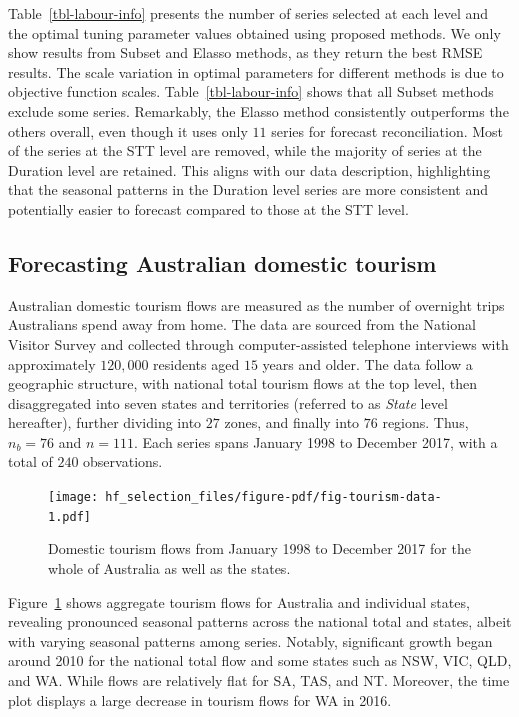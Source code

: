 \documentclass[
  11pt]{article}
\begin{document}
Table~\ref{tbl-labour-info} presents the number of series selected at
each level and the optimal tuning parameter values obtained using
proposed methods. We only show results from Subset and Elasso methods,
as they return the best RMSE results. The scale variation in optimal
parameters for different methods is due to objective function scales.
Table~\ref{tbl-labour-info} shows that all Subset methods exclude some
series. Remarkably, the Elasso method consistently outperforms the
others overall, even though it uses only \(11\) series for forecast
reconciliation. Most of the series at the STT level are removed, while
the majority of series at the Duration level are retained. This aligns
with our data description, highlighting that the seasonal patterns in
the Duration level series are more consistent and potentially easier to
forecast compared to those at the STT level.

\hypertarget{sec-tourism}{%
\subsection{Forecasting Australian domestic tourism}\label{sec-tourism}}

Australian domestic tourism flows are measured as the number of
overnight trips Australians spend away from home. The data are sourced
from the National Visitor Survey and collected through computer-assisted
telephone interviews with approximately \(120,000\) residents aged
\(15\) years and older. The data follow a geographic structure, with
national total tourism flows at the top level, then disaggregated into
seven states and territories (referred to as \emph{State} level
hereafter), further dividing into \(27\) zones, and finally into \(76\)
regions. Thus, \(n_b=76\) and \(n=111\). Each series spans January 1998
to December 2017, with a total of \(240\) observations.

\begin{figure}

{\centering \texttt{[image: hf\_selection\_files/figure-pdf/fig-tourism-data-1.pdf]}

}

\caption{\label{fig-tourism-data}Domestic tourism flows from January
1998 to December 2017 for the whole of Australia as well as the states.}

\end{figure}

Figure~\ref{fig-tourism-data} shows aggregate tourism flows for
Australia and individual states, revealing pronounced seasonal patterns
across the national total and states, albeit with varying seasonal
patterns among series. Notably, significant growth began around 2010 for
the national total flow and some states such as NSW, VIC, QLD, and WA.
While flows are relatively flat for SA, TAS, and NT. Moreover, the time
plot displays a large decrease in tourism flows for WA in 2016.
\end{document}

